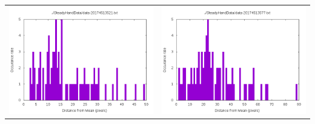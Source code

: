 \documentclass[10pt,letterpaper]{article}
\begin{document}
\begin{table}
\begin{tabular}{cc}
\includegraphics[scale=.5]{graph-data-20174513521.png} & \includegraphics[scale=.5]{graph-data-20174513577.png}\\

\end{tabular}
\end{table}
\end{document}
